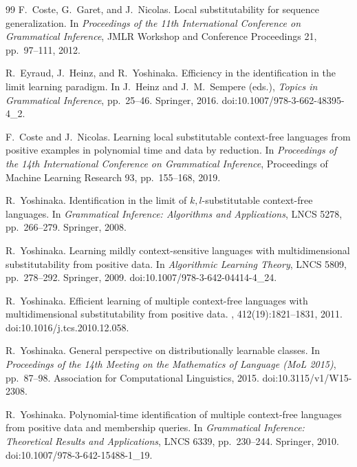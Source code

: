 \documentclass[11pt,a4paper]{ltjsarticle}
\numberwithin{equation}{section}
\theoremstyle{plain}
\theoremstyle{definition}
\theoremstyle{remark}
\theoremstyle{plain}
\begin{document}
\begin{thebibliography}{99}
F.~Coste, G.~Garet, and J.~Nicolas.
\newblock Local substitutability for sequence generalization.
\newblock In {\em Proceedings of the 11th International Conference on
Grammatical Inference}, JMLR Workshop and Conference Proceedings 21,
pp.~97--111, 2012.

R.~Eyraud, J.~Heinz, and R.~Yoshinaka.
\newblock Efficiency in the identification in the limit learning paradigm.
\newblock In J.~Heinz and J.~M.~Sempere (eds.), {\em Topics in Grammatical
Inference}, pp.~25--46. Springer, 2016.
\newblock doi:10.1007/978-3-662-48395-4\_2.

F.~Coste and J.~Nicolas.
\newblock Learning local substitutable context-free languages from positive
examples in polynomial time and data by reduction.
\newblock In {\em Proceedings of the 14th International Conference on
Grammatical Inference}, Proceedings of Machine Learning Research 93,
pp.~155--168, 2019.

R.~Yoshinaka.
\newblock Identification in the limit of $k,l$-substitutable context-free
languages.
\newblock In {\em Grammatical Inference: Algorithms and Applications},
LNCS 5278, pp.~266--279. Springer, 2008.

R.~Yoshinaka.
\newblock Learning mildly context-sensitive languages with multidimensional
 substitutability from positive data.
\newblock In {\em Algorithmic Learning Theory}, LNCS 5809, pp.~278--292.
 Springer, 2009.
\newblock doi:10.1007/978-3-642-04414-4\_24.

R.~Yoshinaka.
\newblock Efficient learning of multiple context-free languages with
multidimensional substitutability from positive data.
, 412(19):1821--1831, 2011.
\newblock doi:10.1016/j.tcs.2010.12.058.

R.~Yoshinaka.
\newblock General perspective on distributionally learnable classes.
\newblock In \emph{Proceedings of the 14th Meeting on the Mathematics
of Language (MoL 2015)}, pp.~87--98.
Association for Computational Linguistics, 2015.
\newblock doi:10.3115/v1/W15-2308.

R.~Yoshinaka.
\newblock Polynomial-time identification of multiple context-free languages
from positive data and membership queries.
\newblock In {\em Grammatical Inference: Theoretical Results and Applications},
LNCS 6339, pp.~230--244. Springer, 2010.
\newblock doi:10.1007/978-3-642-15488-1\_19.


\end{thebibliography}
\end{document}
